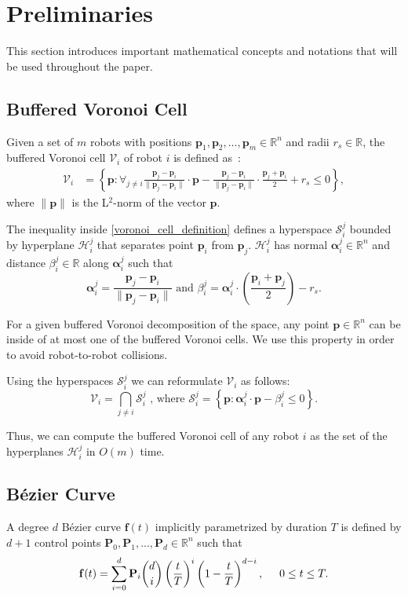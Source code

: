 \documentclass{svproc}
\newcommand{\vp}{\mathbf{p}}
\newcommand{\valpha}{\mathbf{\alpha}}
\newcommand{\vP}{\mathbf{P}}
\newcommand{\vf}{\mathbf{f}}
\newcommand{\cV}{\mathcal{V}}
\newcommand{\cS}{\mathcal{S}}
\newcommand{\cH}{\mathcal{H}}
\newcommand{\R}{\mathbb{R}} %
\begin{document}
\section{Preliminaries}
This section introduces important mathematical concepts and notations that will be used throughout the paper.

\subsection{Buffered Voronoi Cell} \label{bufferedVoronoi}
Given a set of $m$ robots with positions $\vp_1,\vp_2,\ldots,\vp_m \in \R^n$ and radii $r_s \in \R$, the buffered Voronoi cell $\cV_i$ of robot $i$ is defined as~\cite{bufferedVoronoiCells}:
\begin{align}
    \cV_i &= \left\{\vp : \forall_{j\neq i} \frac{\vp_j-\vp_i}{\|\vp_j-\vp_i\|}\cdot \vp - \frac{\vp_j-\vp_i}{\|\vp_j-\vp_i\|}\cdot \frac{\vp_j+\vp_i}{2} + r_s\leq 0 \right\}, \label{voronoi_cell_definition}
\end{align}
where $\|\vp\|$ is the L$^{2}$-norm of the vector $\vp$.

The inequality inside \eqref{voronoi_cell_definition} defines a hyperspace $\cS_i^j$ bounded by hyperplane $\cH_i^j$ that separates point $\vp_i$ from $\vp_j$. $\cH_i^j$ has normal $\valpha_i^j \in \R^n$ and distance $\beta_i^j\in \R$ along $\valpha_i^j$ such that
\begin{equation}
    \valpha_i^j = \frac{\vp_j - \vp_i}{\|\vp_j-\vp_i\|} \text{ and }
    \beta_i^j = \valpha_i^j \cdot \left(\frac{\vp_i + \vp_j}{2}\right) - r_s.
    \label{voronoiAlphaBeta}
\end{equation}

For a given buffered Voronoi decomposition of the space, any point $\vp\in \R^n$ can be inside of at most one of the buffered Voronoi cells.
We use this property in order to avoid robot-to-robot collisions.

Using the hyperspaces $\cS_i^j$ we can reformulate $\cV_i$ as follows:
\begin{equation}
    \cV_i = \bigcap\limits_{j\neq i} \cS_i^j \text{ , where } \cS_i^j = \left\{\vp : \valpha_i^j \cdot \vp - \beta_i^j \leq 0\right\}.
    \label{voronoiEquation}
\end{equation}

Thus, we can compute the buffered Voronoi cell of any robot $i$ as the set of the hyperplanes $\cH_i^j$ in $O(m)$ time.

\subsection{B\'ezier Curve} \label{bezierCurves}
A degree $d$ B\'ezier curve $\vf(t)$ implicitly parametrized by duration $T$ is defined by $d+1$ control points $\vP_0, \vP_1, ..., \vP_d \in \R^n$ such that
\begin{align}
    \vf(t) = \sum_{i=0}^d \vP_i {d\choose i}\left(\frac{t}{T}\right)^i\left(1-\frac{t}{T}\right)^{d-i},\hskip .5cm 0\leq t \leq T.
\end{align}
\end{document}
